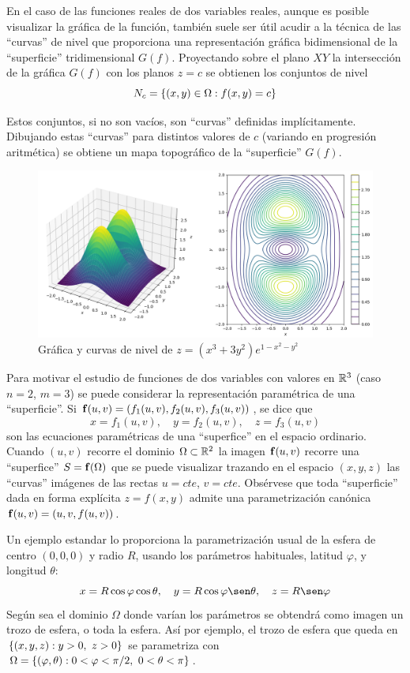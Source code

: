 En el caso de las funciones reales de dos variables reales, aunque es posible visualizar la gráfica de la función, también suele ser útil acudir a la técnica de las ``curvas'' de nivel que proporciona una representación gráfica bidimensional de la ``superficie'' tridimensional $G(f)$. Proyectando sobre el plano $XY$ la intersección de la gráfica $G(f)$ con los planos $z=c$ se obtienen los conjuntos de nivel
$$N_c=\left\lbrace (x,y)\in\Omega : f(x,y)=c\right\rbrace$$

Estos conjuntos, si no son vacíos, son ``curvas'' definidas implícitamente. Dibujando estas ``curvas'' para distintos valores de $c$ (variando en progresión aritmética) se obtiene un mapa topográfico de la ``superficie'' $G(f)$. 
\begin{figure}
    \centering
    \includegraphics[width=\linewidth]{img/graf1.png}
    \caption{ Gráfica y curvas de nivel de $z=(x^3+3y^2)e^{1-x^2-y^2}$ }
\end{figure}
Para motivar el estudio de funciones de dos variables con valores en $\mathbb{R}^3$ (caso $n=2$, $m=3$) se puede considerar la representación paramétrica de una ``superficie''. Si $\mathbf{f}(u,v)=(f_1(u,v), f_2(u,v), f_3(u,v))$, se dice que
$$x=f_1(u,v), \quad y=f_2(u,v), \quad z=f_3(u,v)$$
son las ecuaciones paramétricas de una ``superfice'' en el espacio ordinario. Cuando $(u,v)$ recorre el dominio $\Omega\subset\mathbb{R}^2$ la imagen $\mathbf{f}(u,v)$ recorre una ``superfice'' $S=\mathbf{f}(\Omega)$ que se puede visualizar trazando en el espacio $(x,y,z)$ las ``curvas'' imágenes de las rectas $u=cte$, $v=cte$. Obsérvese que toda ``superficie'' dada en forma explícita $z=f(x,y)$ admite una parametrización canónica $\mathbf{f}(u,v)=(u,v,f(u,v))$.

Un ejemplo estandar lo proporciona la parametrización usual de la esfera de centro $(0,0,0)$ y radio $R$, usando los parámetros habituales, latitud $\varphi$, y longitud $\theta$:
$$x=R\cos\varphi\cos\theta, \quad y=R\cos\varphi\sen\theta, \quad z=R\sen\varphi$$
Según sea el dominio $\Omega$ donde varían los parámetros se obtendrá como imagen un trozo de esfera, o toda la esfera. Así por ejemplo, el trozo de esfera que queda en $\left\lbrace(x,y,z): y>0, \ z>0\right\rbrace$ se parametriza con $\Omega=\left\lbrace(\varphi,\theta): 0<\varphi<\pi/2, \ 0<\theta<\pi\right\rbrace$.

